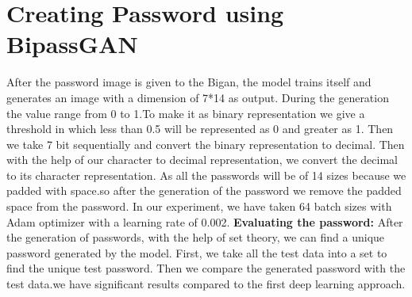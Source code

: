 \documentclass[runningheads]{llncs}
\begin{document}
\section{Creating Password using BipassGAN}
{After the password image is given to the Bigan, the model trains itself and generates an image with a dimension of 7*14 as output. During the generation the value range from 0 to 1.To make it as binary representation we give a threshold in which less than 0.5 will be represented as 0 and greater as 1. Then we take 7 bit sequentially and convert the binary representation to decimal. Then with the help of our character to decimal representation, we convert the decimal to its character representation. As all the passwords will be of 14 sizes because we padded with space.so after the generation of the password we remove the padded space from the password. In our experiment, we have taken 64 batch sizes with Adam optimizer with a learning rate of 0.002.
\newline
\textbf{Evaluating the password:}
\newline
After the generation of passwords, with the help of set theory, we can find a unique password generated by the model. First, we take all the test data into a set to find the unique test password. Then we compare the generated password with the test data.we have significant results compared to the first deep learning approach.
\newline

\begin{table}[htb]
\caption{Result of passgan using the Rockyou data set in 199000 iteration}
\label{1234}
\end{table}
\par
\begin{table}[htb]
\caption{Result of bipassgan using the My space data in 160000 iteration}
\label{123456}
\end{table}}
\end{document}
